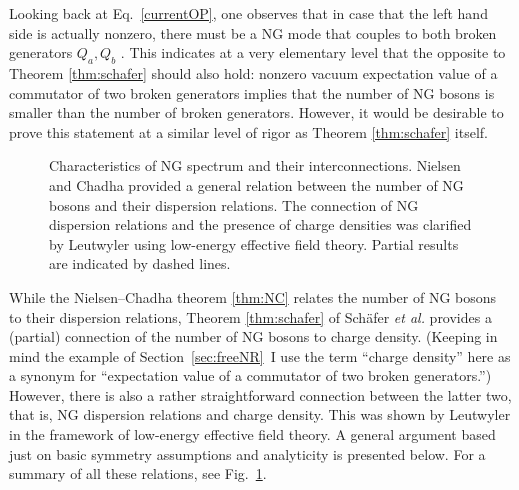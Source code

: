 \documentclass[final,2p,times,12pt,sort&compress]{elsarticle}
\begin{document}
Looking back at Eq.~\eqref{currentOP}, one observes that in case that the left
hand side is actually nonzero, there must be a NG mode that couples to both
broken generators $Q_a,Q_b$ \cite{Brauner:2005di}. This indicates at a very
elementary level that the opposite to Theorem \ref{thm:schafer} should also
hold: nonzero vacuum expectation value of a commutator of two broken generators
implies that the number of NG bosons is smaller than the number of broken
generators. However, it would be desirable to prove this statement at a similar
level of rigor as Theorem \ref{thm:schafer} itself.

\begin{figure}
\begin{center}
\end{center}
\caption{Characteristics of NG spectrum and their interconnections. Nielsen
and Chadha \cite{Nielsen:1975hm} provided a general relation between the number
of NG bosons and their dispersion relations. The connection of NG dispersion
relations and the presence of charge densities was clarified by Leutwyler
\cite{Leutwyler:1993gf} using low-energy effective field theory. Partial results
are indicated by dashed lines.}
\label{fig:NGBchar}
\end{figure}
While the Nielsen--Chadha theorem \ref{thm:NC} relates the number of NG bosons
to their dispersion relations, Theorem \ref{thm:schafer} of Sch\"afer
\emph{et al.} provides a (partial) connection of the number of NG bosons to
charge density. (Keeping in mind the example of Section~\ref{sec:freeNR}\ I use
the term ``charge density'' here as a synonym for ``expectation value of a
commutator of two broken generators.'') However, there is also a rather
straightforward connection between the latter two, that is, NG dispersion
relations and charge density. This was shown by Leutwyler
\cite{Leutwyler:1993gf} in the framework of low-energy effective field theory.
A general argument based just on basic symmetry assumptions and analyticity is
presented below. For a summary of all these relations, see
Fig.~\ref{fig:NGBchar}.
\end{document}
